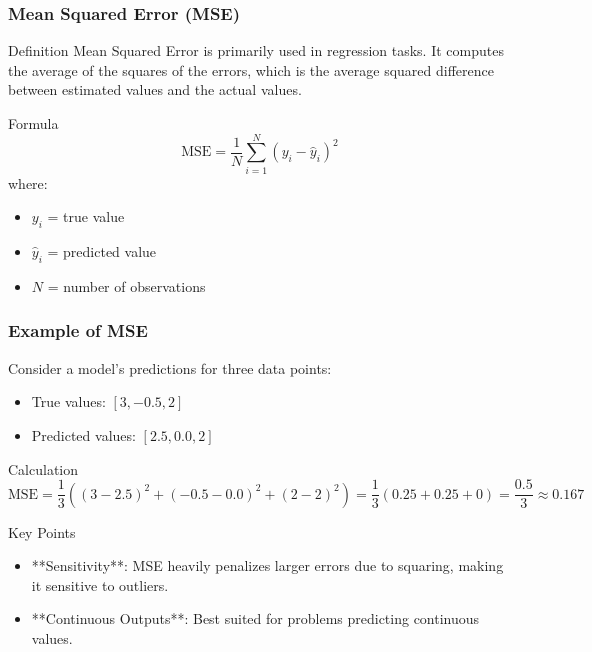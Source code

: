 \documentclass[aspectratio=169]{beamer}
\begin{document}
\begin{frame}[fragile]
  \frametitle{Mean Squared Error (MSE)}
  \begin{block}{Definition}
    Mean Squared Error is primarily used in regression tasks. It computes the average of the squares of the errors, which is the average squared difference between estimated values and the actual values.
  \end{block}

  \begin{block}{Formula}
    \begin{equation}
      \text{MSE} = \frac{1}{N} \sum_{i=1}^{N} (y_i - \hat{y}_i)^2
    \end{equation}
    where:
    \begin{itemize}
      \item \( y_i \) = true value
      \item \( \hat{y}_i \) = predicted value
      \item \( N \) = number of observations
    \end{itemize}
  \end{block}
\end{frame}

\begin{frame}[fragile]
  \frametitle{Example of MSE}
  Consider a model's predictions for three data points:
  \begin{itemize}
    \item True values: \( [3, -0.5, 2] \)
    \item Predicted values: \( [2.5, 0.0, 2] \)
  \end{itemize}
  \begin{block}{Calculation}
    \begin{equation}
      \text{MSE} = \frac{1}{3} \left((3 - 2.5)^2 + (-0.5 - 0.0)^2 + (2 - 2)^2\right) = \frac{1}{3} \left(0.25 + 0.25 + 0\right) = \frac{0.5}{3} \approx 0.167
    \end{equation}
  \end{block}

  \begin{block}{Key Points}
    \begin{itemize}
      \item **Sensitivity**: MSE heavily penalizes larger errors due to squaring, making it sensitive to outliers.
      \item **Continuous Outputs**: Best suited for problems predicting continuous values.
    \end{itemize}
  \end{block}
\end{frame}
\end{document}
